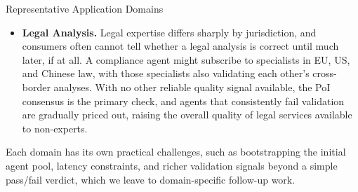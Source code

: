 \begin{insightbox}{Representative Application Domains}
\begin{itemize}[leftmargin=1.5em, itemsep=4pt, topsep=2pt]
    \item \textbf{Legal Analysis.} Legal expertise differs sharply by jurisdiction, and consumers often cannot tell whether a legal analysis is correct until much later, if at all. A compliance agent might subscribe to specialists in EU, US, and Chinese law, with those specialists also validating each other's cross-border analyses. With no other reliable quality signal available, the PoI consensus is the primary check, and agents that consistently fail validation are gradually priced out, raising the overall quality of legal services available to non-experts.
\end{itemize}
\end{insightbox}

Each domain has its own practical challenges, such as bootstrapping the initial agent pool, latency constraints, and richer validation signals beyond a simple pass/fail verdict, which we leave to domain-specific follow-up work.
